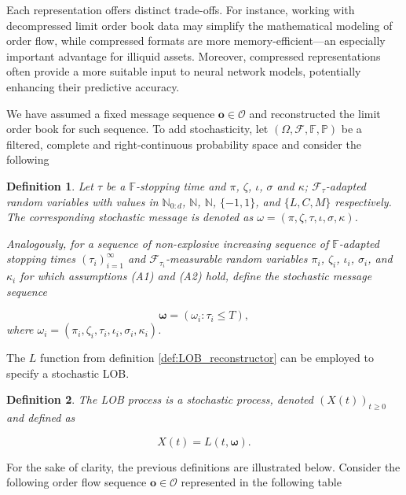 \documentclass[10pt,a4paper,oneside]{article}
\newcommand{\N}{\mathbb{N}}
\newcommand{\Prob}{\mathbb{P}}
\newcommand{\Fil}{\mathbb{F}}
\newcommand{\SigAl}{\mathcal{F}}
\newtheorem{definition}{Definition}
\begin{document}
Each representation offers distinct trade-offs. For instance, working with decompressed limit order book data may simplify the mathematical modeling of order flow, while compressed formats are more memory-efficient—an especially important advantage for illiquid assets. Moreover, compressed representations often provide a more suitable input to neural network models, potentially enhancing their predictive accuracy.


We have assumed a fixed message sequence $\mathbf{o} \in \mathcal{O}$ and reconstructed the limit order book for such sequence. To add stochasticity, let $(\Omega, \SigAl, \Fil, \Prob)$ be a filtered, complete and right-continuous probability space and consider the following 

\begin{definition}
Let $\tau$ be a $\Fil$-stopping time and $\pi$, $\zeta$, $\iota$, $\sigma$ and $\kappa$; $\SigAl_{\tau}$-adapted random variables with values in $\N_{0:d}$, $\N$, $\N$, $\{-1, 1\}$, and $\{L, C, M\}$ respectively. The corresponding stochastic message is denoted as  $\omega = (\pi, \zeta, \tau, \iota, \sigma, \kappa)$.

Analogously, for a sequence of non-explosive increasing sequence of $\Fil$-adapted stopping times $(\tau_i)^{\infty}_{i = 1}$ and $\SigAl_{\tau_i}$-measurable random variables $\pi_i$, $\zeta_i$, $\iota_i$, $\sigma_i$, and $\kappa_i$ for which assumptions (A1) and (A2) hold, define the stochastic message sequence

\begin{equation*}
\boldsymbol{\omega} = (\omega_i : \tau_i \leq T),
\end{equation*}
where $\omega_i = (\pi_i, \zeta_i, \tau_i, \iota_i, \sigma_i, \kappa_i)$. 
\label{def:stochastic_messages}
\end{definition}

The $L$ function from definition \ref{def:LOB_reconstructor} can be employed to specify a stochastic LOB.

\begin{definition} The LOB process is a stochastic process, denoted $(X(t))_{t \geq 0}$ and defined as

\begin{equation*}
X(t) = L(t, \boldsymbol{\omega}).
\end{equation*}
\label{def:lob_process}
\end{definition}

For the sake of clarity, the previous definitions are illustrated below. Consider the following order flow sequence $\mathbf{o} \in \mathcal{O}$ represented in the following table
\end{document}
